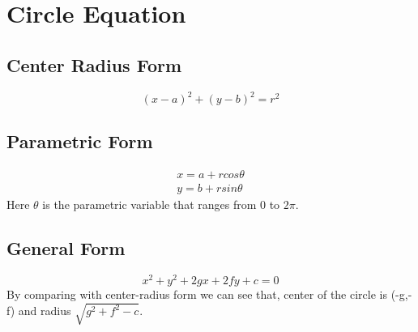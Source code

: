 \documentclass{article}
\begin{document}
\section{Circle Equation}

\subsection{Center Radius Form}
\begin{equation*}
    (x-a)^2+(y-b)^2=r^2
\end{equation*}
\subsection{Parametric Form}
\begin{align*}
    x=a+r cos\theta\\
    y=b+r sin\theta
\end{align*}
Here $\theta$ is the parametric variable that ranges from $0$ to $2\pi$.
\subsection{General Form}
\begin{equation*}
    x^2 + y^2+2gx+2fy+c=0
\end{equation*}
By comparing with center-radius form we can see that, center of the circle is (-g,-f) and radius $\sqrt{g^2+f^2-c}$.
\end{document}
